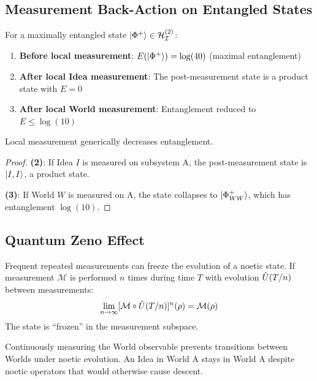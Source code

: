 \subsection{Measurement Back-Action on Entangled States}

\begin{theorem}
\label{thm:measurement-collapse}
For a maximally entangled state $|\Phi^+\rangle \in \mathcal{H}_{\mathcal{I}}^{(2)}$:
\begin{enumerate}
  \item \textbf{Before local measurement}: $E(|\Phi^+\rangle) = \log(40)$ (maximal entanglement)
  \item \textbf{After local Idea measurement}: The post-measurement state is a product state with $E = 0$
  \item \textbf{After local World measurement}: Entanglement reduced to $E \leq \log(10)$
\end{enumerate}
Local measurement generically decreases entanglement.
\end{theorem}

\begin{proof}
\textbf{(2)}: If Idea $I$ is measured on subsystem A, the post-measurement state is $|I, I\rangle$, a product state.

\textbf{(3)}: If World $W$ is measured on A, the state collapses to $|\Phi^+_{WW}\rangle$, which has entanglement $\log(10)$.
\end{proof}

\subsection{Quantum Zeno Effect}

\begin{theorem}
\label{thm:zeno}
Frequent repeated measurements can freeze the evolution of a noetic state. If measurement $\mathcal{M}$ is performed $n$ times during time $T$ with evolution $\hat{U}(T/n)$ between measurements:
\[
\lim_{n \to \infty} [\mathcal{M} \circ \hat{U}(T/n)]^n (\rho) = \mathcal{M}(\rho)
\]
The state is ``frozen'' in the measurement subspace.
\end{theorem}

\begin{corollary}
\label{cor:zeno-noetic}
Continuously measuring the World observable prevents transitions between Worlds under noetic evolution. An Idea in World A stays in World A despite noetic operators that would otherwise cause descent.
\end{corollary}

